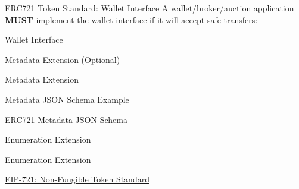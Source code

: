 \documentclass[]{beamer}
\begin{document}
\begin{frame}{ERC721 Token Standard: Wallet Interface}
A wallet/broker/auction application \textbf{MUST} implement the wallet interface if it will accept safe transfers:
\begin{samplecode}{Wallet Interface}
		
\end{samplecode}
\end{frame}

\begin{frame}{Metadata Extension (Optional)}
\begin{samplecode}{Metadata Extension}
		
\end{samplecode}

\vspace{0.5em}

\end{frame}

\begin{frame}{Metadata JSON Schema Example}
\begin{samplecode}{ERC721 Metadata JSON Schema}
		
\end{samplecode}
\end{frame}

\begin{frame}{Enumeration Extension}
\begin{samplecode}{Enumeration Extension}
		
\end{samplecode}

\vspace{1 em}
\link \href{https://eips.ethereum.org/EIPS/eip-721}{EIP-721: Non-Fungible Token Standard}
\end{frame}

%	
%	
\end{document}
